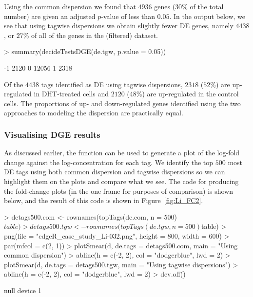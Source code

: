 Using the common dispersion we found that $4936$ genes ($30$\% of the
total number) are given an adjusted $p$-value of less than $0.05$. In
the output below, we see that using tagwise dispersions we obtain
slightly fewer DE genes, namely $4438$, or $27$\% of all of the genes
in the (filtered) dataset.

\begin{Schunk}
\begin{Sinput}
> summary(decideTestsDGE(de.tgw, p.value = 0.05))
\end{Sinput}
\begin{Soutput}
   [,1] 
-1  2120
0  12056
1   2318
\end{Soutput}
\end{Schunk}

Of the $4438$ tags identified as DE using tagwise dispersions, $2318$
($52$\%) are up-regulated in DHT-treated cells and $2120$ ($48$\%) are
up-regulated in the control cells. The proportions of up- and
down-regulated genes identified using the two approaches to modeling
the dispersion are practically equal.


\subsubsection{Visualising DGE results}
As discussed earlier, the function  can be used to
generate a plot of the log-fold change against the log-concentration
for each tag. We identify the top $500$ most DE tags using both common
dispersion and tagwise dispersions so we can highlight them on the
plots and compare what we see. The code for producing the fold-change
plots (in the one frame for purposes of comparison) is shown below,
and the result of this code is shown in Figure~\ref{fig:Li_FC2}.

\begin{Schunk}
\begin{Sinput}
> detags500.com <- rownames(topTags(de.com, n = 500)$table)
> detags500.tgw <- rownames(topTags(de.tgw, n = 500)$table)
> png(file = "edgeR_case_study_Li-032.png", height = 800, width = 600)
> par(mfcol = c(2, 1))
> plotSmear(d, de.tags = detags500.com, main = "Using common dispersion")
> abline(h = c(-2, 2), col = "dodgerblue", lwd = 2)
> plotSmear(d, de.tags = detags500.tgw, main = "Using tagwise dispersions")
> abline(h = c(-2, 2), col = "dodgerblue", lwd = 2)
> dev.off()
\end{Sinput}
\begin{Soutput}
null device 
          1 
\end{Soutput}
\end{Schunk}

